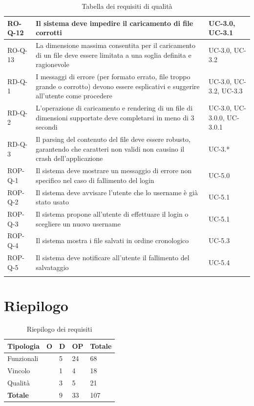 \documentclass[11pt,a4paper]{article}
\begin{document}
\begin{longtable}{|p{}|>{\raggedright\arraybackslash}p{}|p{}|}
\hline
RO-Q-12 & Il sistema deve impedire il caricamento di file corrotti & UC-3.0, UC-3.1\\
\hline
RO-Q-13 & La dimensione massima consentita per il caricamento di un file deve essere limitata a una soglia definita e ragionevole & UC-3.0, UC-3.2 \\
\hline
RD-Q-1 & I messaggi di errore (per formato errato, file troppo grande o corrotto) devono essere esplicativi e suggerire all'utente come procedere & UC-3.0, UC-3.2, UC-3.3 \\
\hline
RD-Q-2 & L'operazione di caricamento e rendering di un file di dimensioni supportate deve completarsi in meno di 3 secondi & UC-3.0, UC-3.0.0, UC-3.0.1 \\
\hline
RD-Q-3 & Il parsing del contenuto del file deve essere robusto, garantendo che caratteri non validi non causino il crash dell'applicazione & UC-3.* \\
\hline
ROP-Q-1 & Il sistema deve mostrare un messaggio di errore non specifico nel caso di fallimento del login & UC-5.0 \\
\hline
ROP-Q-2 & Il sistema deve avvisare l'utente che lo username è già stato usato & UC-5.1 \\
\hline
ROP-Q-3 & Il sistema propone all'utente di effettuare il login o scegliere un nuovo username & UC-5.1 \\
\hline
ROP-Q-4 & Il sistema mostra i file salvati in ordine cronologico & UC-5.3 \\
\hline
ROP-Q-5 & Il sistema deve notificare all'utente il fallimento del salvataggio & UC-5.4 \\
\hline
\addlinespace[1em]
\caption{Tabella dei requisiti di qualità}
\end{longtable}

\newpage

\section{Riepilogo}
\begin{table}[H]
\centering
\begin{tabular}{|p{}|>{\raggedright\arraybackslash}p{}|p{}|p{}|p{}|}
\hline
\textbf{Tipologia} & \textbf{O} & \textbf{D} & \textbf{OP} & \textbf{Totale}\\
\hline
Funzionali & 39 & 5 & 24 & 68 \\
\hline
Vincolo & 13 & 1 & 4 & 18 \\
\hline
Qualità & 13 & 3 & 5 & 21 \\
\hline
\textbf{Totale} & 65 & 9 & 33 & 107\\
\hline
\end{tabular}
\caption{Riepilogo dei requisiti}
\end{table}
\end{document}
